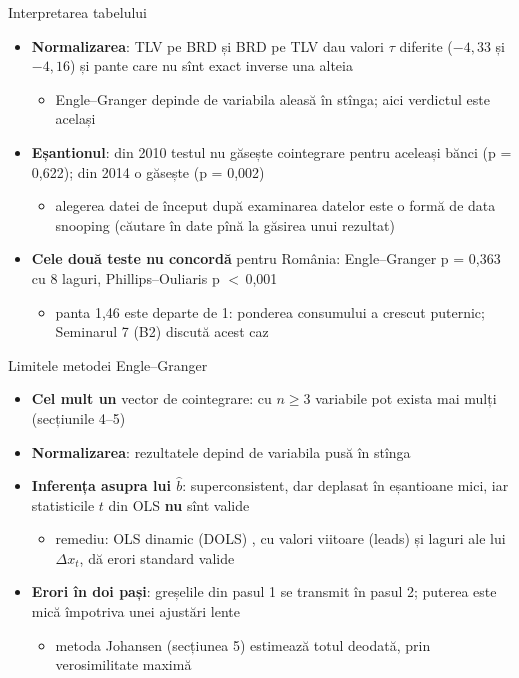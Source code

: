 \begin{frame}{Interpretarea tabelului}
\itemsize{\small}
\begin{itemize}
    \item \textbf{Normalizarea}: TLV pe BRD și BRD pe TLV dau valori $\tau$ diferite ($-4{,}33$ și $-4{,}16$) și pante care nu sînt exact inverse una alteia
    \begin{itemize}
        \item Engle--Granger depinde de variabila aleasă în stînga; aici verdictul este același
    \end{itemize}
    \item \textbf{Eșantionul}: din 2010 testul nu găsește cointegrare pentru aceleași bănci (p = 0{,}622); din 2014 o găsește (p = 0{,}002)
    \begin{itemize}
        \item alegerea datei de început după examinarea datelor este o formă de data snooping (căutare în date pînă la găsirea unui rezultat)
    \end{itemize}
    \item \textbf{Cele două teste nu concordă} pentru România: Engle--Granger p = 0{,}363 cu 8 laguri, Phillips--Ouliaris p $<$\,0{,}001
    \begin{itemize}
        \item panta 1{,}46 este departe de 1: ponderea consumului a crescut puternic; Seminarul 7 (B2) discută acest caz
    \end{itemize}
\end{itemize}
\end{frame}

\begin{frame}{Limitele metodei Engle--Granger}
\itemsize{\small}
\begin{itemize}
    \item \textbf{Cel mult un} vector de cointegrare: cu $n \ge 3$ variabile pot exista mai mulți (secțiunile 4--5)
    \item \textbf{Normalizarea}: rezultatele depind de variabila pusă în stînga
    \item \textbf{Inferența asupra lui $\hat b$}: superconsistent, dar deplasat în eșantioane mici, iar statisticile $t$ din OLS \textbf{nu} sînt valide
    \begin{itemize}
        \item remediu: OLS dinamic (DOLS) , cu valori viitoare (leads) și laguri ale lui $\Delta x_t$, dă erori standard valide
    \end{itemize}
    \item \textbf{Erori în doi pași}: greșelile din pasul 1 se transmit în pasul 2; puterea este mică împotriva unei ajustări lente
    \begin{itemize}
        \item metoda Johansen (secțiunea 5) estimează totul deodată, prin verosimilitate maximă
    \end{itemize}
\end{itemize}
\end{frame}

